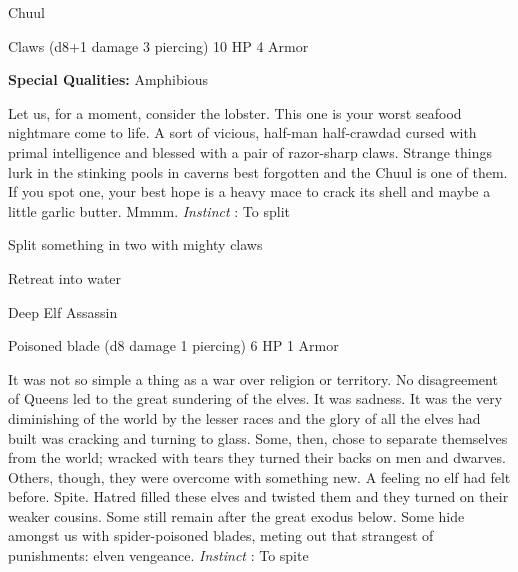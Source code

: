        
\stopitemize
       
\startMonsterName
Chuul	 
\stopMonsterName
       

Claws (d8+1 damage 3 piercing)	10 HP	4 Armor

       


       
\startMonsterQualities
         {\bf Special Qualities:}  Amphibious
\stopMonsterQualities
       
\startMonsterDescription
Let us, for a moment, consider the lobster. This one is your worst seafood nightmare come to life. A sort of vicious, half-man half-crawdad cursed with primal intelligence and blessed with a pair of razor-sharp claws. Strange things lurk in the stinking pools in caverns best forgotten and the Chuul is one of them. If you spot one, your best hope is a heavy mace to crack its shell and maybe a little garlic butter. Mmmm. {\em Instinct} : To split
\stopMonsterDescription
       
\startitemize[1,packed]
         
\item Split something in two with mighty claws

         
\item Retreat into water

       
\stopitemize
       
\startMonsterName
Deep Elf Assassin	 
\stopMonsterName
       

Poisoned blade (d8 damage 1 piercing)	6 HP	1 Armor

       


       
\startMonsterDescription
It was not so simple a thing as a war over religion or territory. No disagreement of Queens led to the great sundering of the elves. It was sadness. It was the very diminishing of the world by the lesser races and the glory of all the elves had built was cracking and turning to glass. Some, then, chose to separate themselves from the world; wracked with tears they turned their backs on men and dwarves. Others, though, they were overcome with something new. A feeling no elf had felt before. Spite. Hatred filled these elves and twisted them and they turned on their weaker cousins. Some still remain after the great exodus below. Some hide amongst us with spider-poisoned blades, meting out that strangest of punishments: elven vengeance. {\em Instinct} : To spite
\stopMonsterDescription
       
